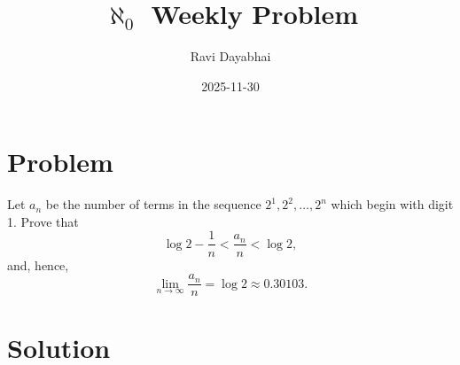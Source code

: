 \documentclass{article}
\title{$\aleph_{0}$ Weekly Problem}
\author{Ravi Dayabhai}
\date{2025-11-30}
\begin{document}
\maketitle

\section*{Problem}

Let $a_n$ be the number of terms in the sequence $2^{1}, 2^{2}, \ldots, 2^{n}$ which begin with digit 1. Prove that
  \[
    \log{2} - \frac{1}{n} < \frac{a_{n}}{n} < \log{2},
  \]
and, hence,
  \[
    \lim_{n \to \infty} \frac{a_{n}}{n} = \log{2} \approx 0.30103. 
  \]

\section*{Solution}
\end{document}

